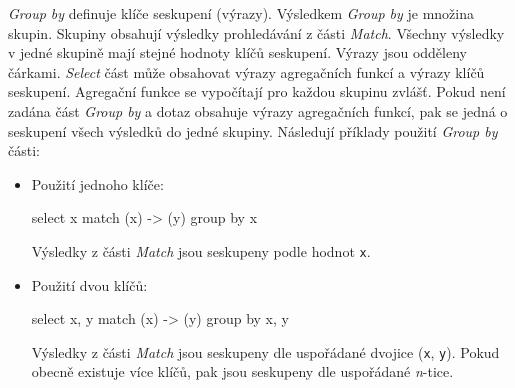\textit{Group by} definuje klíče seskupení (výrazy).
Výsledkem \textit{Group by} je množina skupin.
Skupiny obsahují výsledky prohledávání z části \textit{Match}.
Všechny výsledky v jedné skupině mají stejné hodnoty klíčů seskupení. 
Výrazy jsou odděleny čárkami.
\textit{Select} část může obsahovat výrazy agregačních funkcí a výrazy klíčů seskupení.
Agregační funkce se vypočítají pro každou skupinu zvlášť.
Pokud není zadána část \textit{Group by} a dotaz obsahuje výrazy agregačních funkcí, pak se jedná o seskupení všech výsledků do jedné skupiny.
Následují příklady použití \textit{Group by} části:
\begin{itemize}
\item
Použití jednoho klíče:
\begin{code}
select x match (x) -> (y) group by x
\end{code}
Výsledky z části \textit{Match} jsou seskupeny podle hodnot \texttt{x}.

\item
Použití dvou klíčů:
\begin{code}
select x, y match (x) -> (y) group by x, y
\end{code}
Výsledky z části \textit{Match} jsou seskupeny dle uspořádané dvojice (\texttt{x}, \texttt{y}).
Pokud obecně existuje více klíčů, pak jsou seskupeny dle uspořádané \textit{n}-tice.
\end{itemize}